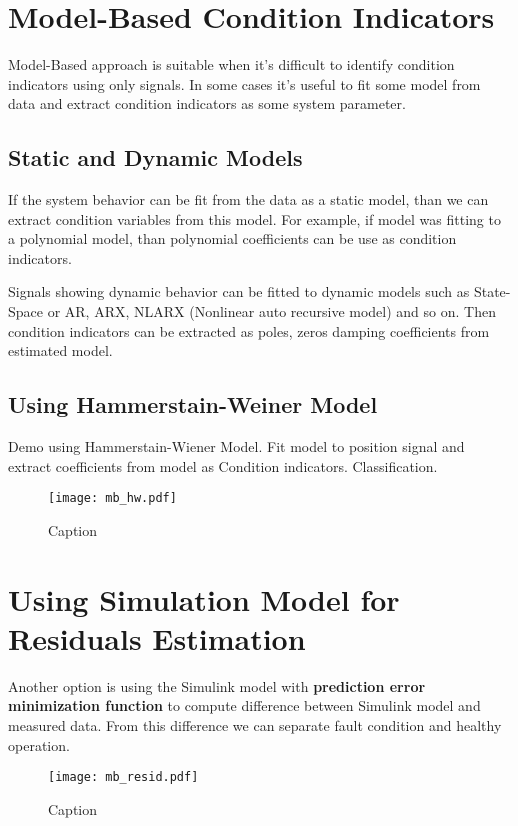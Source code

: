 \section{Model-Based Condition Indicators}
Model-Based approach is suitable when it's difficult to identify condition
indicators using only signals. In some cases it's useful to fit some model
from data and extract condition indicators as some system parameter.

\subsection{Static and Dynamic Models}
If the system behavior can be fit from the data as a static model, than we
can extract condition variables from this model. For example, if model
was fitting to a polynomial model, than polynomial coefficients can be use
as condition indicators.

Signals showing dynamic behavior can be fitted to dynamic models such as
State-Space or AR, ARX, NLARX (Nonlinear auto recursive model) and so on.
Then condition indicators can be extracted as poles, zeros damping
coefficients from estimated model.


\subsection{Using Hammerstain-Weiner Model}
Demo using Hammerstain-Wiener Model. Fit model to position signal and
extract coefficients from model as Condition indicators. Classification.

\begin{figure}[h!]
    \centering
    \texttt{[image: mb\_hw.pdf]}
    \caption{Caption}
    \label{fig:}
\end{figure}


\section{Using Simulation Model for Residuals Estimation}\label{sec:residuals}

Another option is using the Simulink model with \textbf{prediction
error minimization function} to compute difference between Simulink model
and measured data. From this difference we can separate fault condition and
healthy operation. 

\begin{figure}[h!]
    \centering
    \texttt{[image: mb\_resid.pdf]}
    \caption{Caption}
    \label{fig:}
\end{figure}


